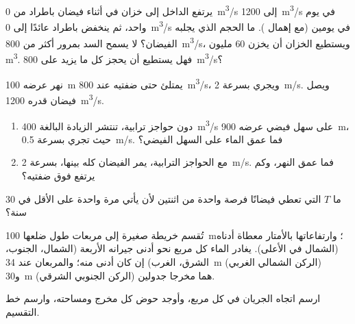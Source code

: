 \begin{exercise}[$\star\star\star$]\label{exo:g10:drainage-basins:12}
يرتفع  الداخل إلى خزان في أثناء فيضان باطراد من
\qty{0}{m^3/s} إلى \qty{1200}{m^3/s} في يوم واحد، ثم ينخفض باطراد عائدًا إلى
\qty{0}{m^3/s} في يومين (مع إهمال ). ما الحجم الذي يجلبه الفيضان؟
لا يسمح السد بمرور أكثر من \qty{800}{m^3/s}، ويستطيع الخزان أن
يخزن \num{60} مليون \unit{m^3}. فهل يستطيع أن يحجز كل ما يزيد على
\qty{800}{m^3/s}؟
\end{exercise}

\begin{exercise}[$\star\star\star$]\label{exo:g10:drainage-basins:13}
نهر عرضه \qty{100}{m} يمتلئ حتى ضفتيه عند \qty{800}{m^3/s}، ويجري
بسرعة \qty{2}{m/s}. ويصل فيضان قدره \qty{1200}{m^3/s}.
\begin{enumerate}
  \item دون حواجز ترابية، تنتشر الزيادة البالغة \qty{400}{m^3/s} على سهل فيضي
        عرضه \qty{900}{m}، حيث تجري بسرعة \qty{0.5}{m/s}. فما عمق
        الماء على السهل الفيضي؟
  \item مع الحواجز الترابية، يمر الفيضان كله بينها، بسرعة \qty{2}{m/s}.
        فما عمق النهر، وكم يرتفع فوق ضفتيه؟
\end{enumerate}
\end{exercise}

\begin{exercise}[$\star\star\star$]\label{exo:g10:drainage-basins:14}
ما  $T$ التي تعطي فيضانًا فرصة واحدة من اثنتين لأن يأتي مرة واحدة على
الأقل في \num{30} سنة؟
\end{exercise}

\begin{exercise}[$\star\star\star$]\label{exo:g10:drainage-basins:15}
تُقسم خريطة صغيرة إلى مربعات طول ضلعها \qty{100}{m}؛ وارتفاعاتها بالأمتار
معطاة أدناه (الشمال في الأعلى). يغادر الماء كل مربع نحو أدنى
جيرانه الأربعة (الشمال، الجنوب، الشرق، الغرب) إن كان أدنى منه؛ والمربعان
عند \qty{34}{m} (الركن الشمالي الغربي) و\qty{30}{m} (الركن الجنوبي الشرقي) هما
مخرجا جدولين.
\begin{center}
\end{center}
ارسم اتجاه الجريان في كل مربع، وأوجد حوض كل مخرج
ومساحته، وارسم خط التقسيم.
\end{exercise}

